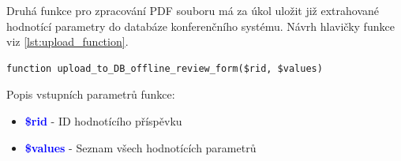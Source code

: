Druhá funkce pro zpracování PDF souboru má za úkol uložit již extrahované hodnotící parametry do databáze konferenčního systému. Návrh hlavičky funkce viz \ref{lst:upload_function}.

\begin{lstlisting}[caption = {Návrh hlavičky funkce pro uložení dat do databáze}, label = {lst:upload_function}, captionpos=b]
function upload_to_DB_offline_review_form($rid, $values)
\end{lstlisting}
Popis vstupních parametrů funkce:
\begin{itemize}
	\item\textcolor{blue}{\textbf{\$rid}} - ID hodnotícího příspěvku
	\item\textcolor{blue}{\textbf{\$values}} - Seznam všech hodnotících parametrů 
\end{itemize}